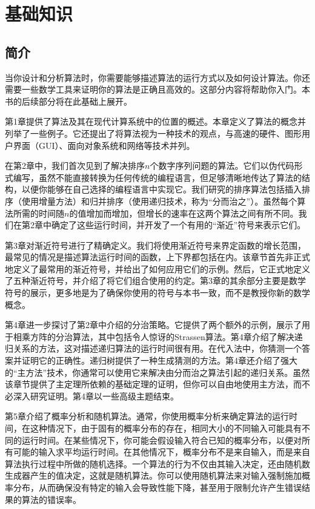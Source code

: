 \documentclass[lang=cn,newtx,10pt,scheme=chinese]{elegantbook}
\begin{document}
\tableofcontents

\part{基础知识}

\chapter*{简介}

当你设计和分析算法时，你需要能够描述算法的运行方式以及如何设计算法。你还需要一些数学工具来证明你的算法是正确且高效的。这部分内容将帮助你入门。本书的后续部分将在此基础上展开。

第1章提供了算法及其在现代计算系统中的位置的概述。本章定义了算法的概念并列举了一些例子。它还提出了将算法视为一种技术的观点，与高速的硬件、图形用户界面（GUI）、面向对象系统和网络等技术并列。

在第2章中，我们首次见到了解决排序$n$个数字序列问题的算法。它们以伪代码形式编写，虽然不能直接转换为任何传统的编程语言，但足够清晰地传达了算法的结构，以便你能够在自己选择的编程语言中实现它。我们研究的排序算法包括插入排序（使用增量方法）和归并排序（使用递归技术，称为“分而治之”）。虽然每个算法所需的时间随$n$的值增加而增加，但增长的速率在这两个算法之间有所不同。我们在第2章中确定了这些运行时间，并开发了一个有用的“渐近”符号来表示它们。

第3章对渐近符号进行了精确定义。我们将使用渐近符号来界定函数的增长范围，最常见的情况是描述算法运行时间的函数，上下界都包括在内。该章节首先非正式地定义了最常用的渐近符号，并给出了如何应用它们的示例。然后，它正式地定义了五种渐近符号，并介绍了将它们组合使用的约定。第3章的其余部分主要是数学符号的展示，更多地是为了确保你使用的符号与本书一致，而不是教授你新的数学概念。

第4章进一步探讨了第2章中介绍的分治策略。它提供了两个额外的示例，展示了用于相乘方阵的分治算法，其中包括令人惊讶的Strassen算法。第4章介绍了解决递归关系的方法，这对描述递归算法的运行时间很有用。在代入法中，你猜测一个答案并证明它的正确性。递归树提供了一种生成猜测的方法。第4章还介绍了强大的“主方法”技术，你通常可以使用它来解决由分而治之算法引起的递归关系。虽然该章节提供了主定理所依赖的基础定理的证明，但你可以自由地使用主方法，而不必深入研究证明。第4章以一些高级主题结束。

第5章介绍了概率分析和随机算法。通常，你使用概率分析来确定算法的运行时间，在这种情况下，由于固有的概率分布的存在，相同大小的不同输入可能具有不同的运行时间。在某些情况下，你可能会假设输入符合已知的概率分布，以便对所有可能的输入求平均运行时间。在其他情况下，概率分布不是来自输入，而是来自算法执行过程中所做的随机选择。一个算法的行为不仅由其输入决定，还由随机数生成器产生的值决定，这就是随机算法。你可以使用随机算法来对输入强制施加概率分布，从而确保没有特定的输入会导致性能下降，甚至用于限制允许产生错误结果的算法的错误率。
\end{document}
